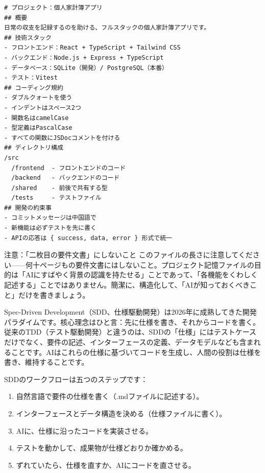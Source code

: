 \begin{lstlisting}
# プロジェクト：個人家計簿アプリ
## 概要
日常の収支を記録するのを助ける、フルスタックの個人家計簿アプリです。
## 技術スタック
- フロントエンド：React + TypeScript + Tailwind CSS
- バックエンド：Node.js + Express + TypeScript
- データベース：SQLite（開発）/ PostgreSQL（本番）
- テスト：Vitest
## コーディング規約
- ダブルクォートを使う
- インデントはスペース2つ
- 関数名はcamelCase
- 型定義はPascalCase
- すべての関数にJSDocコメントを付ける
## ディレクトリ構成
/src
  /frontend  - フロントエンドのコード
  /backend   - バックエンドのコード
  /shared    - 前後で共有する型
  /tests     - テストファイル
## 開発の約束事
- コミットメッセージは中国語で
- 新機能は必ずテストを先に書く
- APIの応答は { success, data, error } 形式で統一
\end{lstlisting}

\begin{tcbwarn}{注意：「二枚目の要件文書」にしないこと}
このファイルの長さに注意してください——何十ページもの要件文書にはしないこと。プロジェクト記憶ファイルの目的は「AIにすばやく背景の認識を持たせる」ことであって、「各機能をくわしく記述する」ことではありません。簡潔に、構造化して、「AIが知っておくべきこと」だけを書きましょう。

\end{tcbwarn}


Spec-Driven Development（SDD、仕様駆動開発）は2026年に成熟してきた開発パラダイムです。核心理念はひと言：先に仕様を書き、それからコードを書く。従来のTDD（テスト駆動開発）と違うのは、SDDの「仕様」にはテストケースだけでなく、要件の記述、インターフェースの定義、データモデルなども含まれることです。AIはこれらの仕様に基づいてコードを生成し、人間の役割は仕様を書き、維持することです。

SDDのワークフローは五つのステップです：

\begin{enumerate}
  \item 自然言語で要件の仕様を書く（.mdファイルに記述する）。
  \item インターフェースとデータ構造を決める（仕様ファイルに書く）。
  \item AIに、仕様に沿ったコードを実装させる。
  \item テストを動かして、成果物が仕様どおりか確かめる。
  \item ずれていたら、仕様を直すか、AIにコードを直させる。
\end{enumerate}

